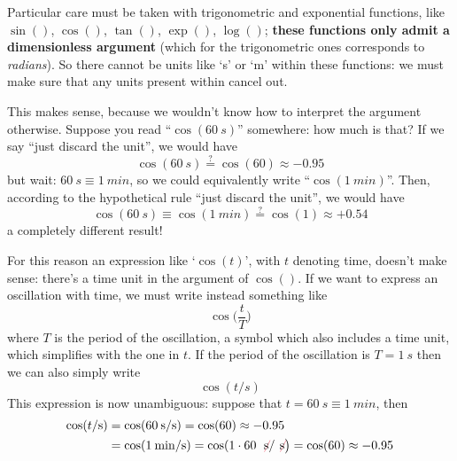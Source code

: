 \documentclass[a4paper,12pt,%
onecolumn,oneside,%
british%
]{memoir}
\renewcommand*{\|}[1][]{\nonscript\:#1\vert\nonscript\:\mathopen{}}
\begin{document}
\medskip

Particular care must be taken with trigonometric and exponential functions, like $\sin()$, $\cos()$, $\tan()$, $\exp()$, $\log()$; \textbf{these functions only admit a dimensionless argument} (which for the trigonometric ones corresponds to \emph{radians}). So there cannot be units like \enquote*{\unit{s}} or \enquote*{\unit{m}} within these functions: we must make sure that any units present within cancel out.

This makes sense, because we wouldn't know how to interpret the argument otherwise. Suppose you read \enquote{$\cos(\qty{60}{s})$} somewhere: how much is that? If we say \enquote{just discard the unit}, we would have
\begin{equation*}
  \cos(\qty{60}{s}) \stackrel{?}{=} \cos(60) \approx -0.95
\end{equation*}
but wait: $\qty{60}{s}\equiv\qty{1}{min}$, so we could equivalently write \enquote{$\cos(\qty{1}{min})$}. Then, according to the hypothetical rule \enquote{just discard the unit}, we would have
\begin{equation*}
  \cos(\qty{60}{s}) \equiv \cos(\qty{1}{min})\stackrel{?}{=} \cos(1) \approx +0.54
\end{equation*}
a completely different result!

For this reason an expression like \enquote*{$\cos(t)$}, with $t$ denoting time, doesn't make sense: there's a time unit in the argument of $\cos()$. If we want to express an oscillation with time, we must write instead something like
\begin{equation*}
  \cos\biggl(\frac{t}{T}\biggr)
\end{equation*}
where $T$ is the period of the oscillation, a symbol which also includes a time unit, which simplifies with the one in $t$. If the period of the oscillation is $T=\qty{1}{s}$ then we can also simply write
\begin{equation*}
  \cos(t/\unit{s})
\end{equation*}
This expression is now unambiguous: suppose that $t=\qty{60}{s}\equiv\qty{1}{min}$, then
\begin{equation*}
  \begin{aligned}
    \cos(t/\unit{s})
    &= \cos(\qty{60}{s}/\unit{s}) =\cos(60) \approx -0.95
    \\
    &= \cos(\qty{1}{min}/\unit{s}) =\cos(1\cdot 60\:\mathcolor{red}{\not}\!\unit{s}/\mathcolor{red}{\not}\!\unit{s}\bigr)
=\cos(60) \approx -0.95
  \end{aligned}
\end{equation*}
\end{document}
